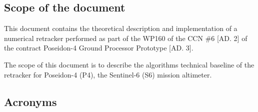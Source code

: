 \documentclass[11pt,a4paper]{article}
\begin{document}
\subsection{Scope of the document}

This document contains the theoretical description and implementation of a numerical retracker performed as part of the  WP160 of the CCN \#6 [AD. 2] of the contract Poseidon-4 Ground Processor Prototype [AD. 3].

The scope of this document is to describe the algorithms technical baseline of the retracker for Poseidon-4 (P4), the Sentinel-6 (S6) mission altimeter.


% 


\subsection{Acronyms}
\end{document}
